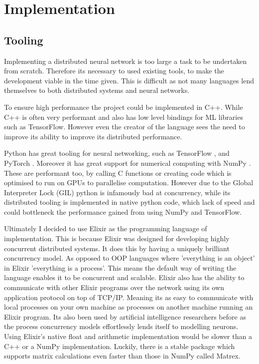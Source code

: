 \clearpage
\section{Implementation}

\subsection{Tooling}
Implementing a distributed neural network is too large a task to be undertaken
from scratch. Therefore its necessary to used existing tools, to make the
development viable in the time given. This is difficult as not many languages
lend themselves to both distributed systems and neural networks.

To ensure high performance the project could be implemented in C++. While C++ is
often very performant and also has low level bindings for ML libraries such as
TensorFlow. However even the creator of the language sees the need to improve
its ability to improve its distributed performance. \cite{stroustrupInterview}

Python has great tooling for neural networking, such as TensorFlow
\cite{abadi2016tensorflow}, and PyTorch \cite{paszke2019pytorch}. Moreover it
has great support for numerical computing with NumPy \cite{harrisNumpy2020}.
These are performant too, by calling C functions or creating code which is
optimised to run on GPUs to parallelise computation. However due to the Global
Interpreter Lock (GIL) python is infamously bad at concurrency, while its
distributed tooling is implemented in native python code, which lack of speed
and could bottleneck the performance gained from using NumPy and TensorFlow.

Ultimately I decided to use Elixir as the programming language of
implementation. This is because Elixir was designed for developing highly
concurrent distributed systems. It does this by having a uniquely brilliant
concurrency model. As opposed to OOP languages where 'everything is an object'
in Elixir 'everything is a process'. This means the default way of writing the
language enables it to be concurrent and scalable. Elixir also has the ability
to communicate with other Elixir programs over the network using its own
application protocol on top of TCP/IP. Meaning its as easy to communicate with
local processes on your own machine as processes on another machine running an
Elixir program. Its also been used by artificial intelligence researchers before
as the process concurrency models effortlessly lends itself to modelling
neurons. \cite{sherNeuroevolutionThroughErlang} Using Elixir's native float and
arithmetic implementation would be slower than a C++ or a NumPy implementation.
Luckily, there is a stable package which supports matrix calculations even faster
than those in NumPy called Matrex. \cite{matrex}

